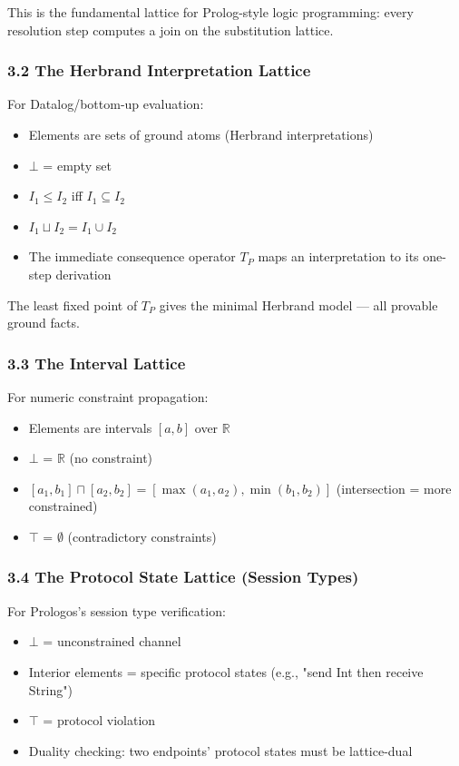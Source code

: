 \documentclass[11pt]{article}
\begin{document}
This is the fundamental lattice for Prolog-style logic programming:
every resolution step computes a join on the substitution lattice.
\subsubsection{3.2 The Herbrand Interpretation Lattice}
\label{sec:org512d620}

For Datalog/bottom-up evaluation:

\begin{itemize}
\item Elements are sets of ground atoms (Herbrand interpretations)
\item \(\bot\) = empty set
\item \(I_1 \leq I_2\) iff \(I_1 \subseteq I_2\)
\item \(I_1 \sqcup I_2 = I_1 \cup I_2\)
\item The immediate consequence operator \(T_P\) maps an interpretation to its
one-step derivation
\end{itemize}

The least fixed point of \(T_P\) gives the minimal Herbrand model --- all
provable ground facts.
\subsubsection{3.3 The Interval Lattice}
\label{sec:orgb43961f}

For numeric constraint propagation:

\begin{itemize}
\item Elements are intervals \([a, b]\) over \(\mathbb{R}\)
\item \(\bot\) = \(\mathbb{R}\) (no constraint)
\item \([a_1, b_1] \sqcap [a_2, b_2] = [\max(a_1, a_2), \min(b_1, b_2)]\)
(intersection = more constrained)
\item \(\top\) = \(\emptyset\) (contradictory constraints)
\end{itemize}
\subsubsection{3.4 The Protocol State Lattice (Session Types)}
\label{sec:org2381593}

For Prologos's session type verification:

\begin{itemize}
\item \(\bot\) = unconstrained channel
\item Interior elements = specific protocol states (e.g., "send Int then receive String")
\item \(\top\) = protocol violation
\item Duality checking: two endpoints' protocol states must be lattice-dual
\end{itemize}
\end{document}
